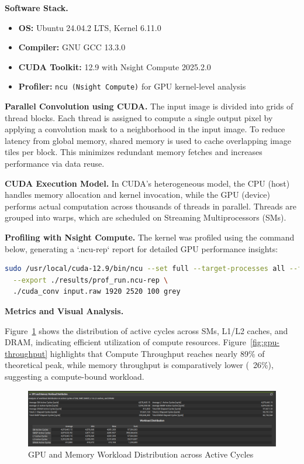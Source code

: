 \documentclass[conference, 10pt]{IEEEtran}
\begin{document}
\textbf{Software Stack.}
\begin{itemize}
    \item \textbf{OS:} Ubuntu 24.04.2 LTS, Kernel 6.11.0
    \item \textbf{Compiler:} GNU GCC 13.3.0
    \item \textbf{CUDA Toolkit:} 12.9 with Nsight Compute 2025.2.0
    \item \textbf{Profiler:} \texttt{ncu (Nsight Compute)} for GPU kernel-level analysis
\end{itemize}

\textbf{Parallel Convolution using CUDA.}  
The input image is divided into grids of thread blocks. Each thread is assigned to compute a single output pixel by applying a convolution mask to a neighborhood in the input image. To reduce latency from global memory, shared memory is used to cache overlapping image tiles per block. This minimizes redundant memory fetches and increases performance via data reuse.

\textbf{CUDA Execution Model.}  
In CUDA's heterogeneous model, the CPU (host) handles memory allocation and kernel invocation, while the GPU (device) performs actual computation across thousands of threads in parallel. Threads are grouped into warps, which are scheduled on Streaming Multiprocessors (SMs).

\textbf{Profiling with Nsight Compute.}  
The kernel was profiled using the command below, generating a `.ncu-rep` report for detailed GPU performance insights:

\begin{lstlisting}[language=bash, caption={Nsight Compute Profiling Command}]
sudo /usr/local/cuda-12.9/bin/ncu --set full --target-processes all --force-overwrite \
  --export ./results/prof_run.ncu-rep \
  ./cuda_conv input.raw 1920 2520 100 grey
\end{lstlisting}

\textbf{Metrics and Visual Analysis.}

Figure~\ref{fig:workload-distribution} shows the distribution of active cycles across SMs, L1/L2 caches, and DRAM, indicating efficient utilization of compute resources.  
Figure~\ref{fig:gpu-throughput} highlights that Compute Throughput reaches nearly 89\% of theoretical peak, while memory throughput is comparatively lower (~26\%), suggesting a compute-bound workload.

\vspace{1em}

\begin{figure}[H]
    \centering
    \includegraphics[width=0.95\linewidth]{figures/WorkloadDistribution.png}
    \caption{GPU and Memory Workload Distribution across Active Cycles}
    \label{fig:workload-distribution}
\end{figure}
\end{document}
